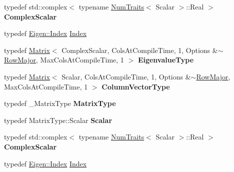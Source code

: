 \begin{DoxyCompactItemize}
typedef std\+::complex$<$ typename \hyperlink{group___core___module_struct_eigen_1_1_num_traits}{Num\+Traits}$<$ Scalar $>$\+::Real $>$ {\bfseries Complex\+Scalar}
\item 
typedef \hyperlink{namespace_eigen_a62e77e0933482dafde8fe197d9a2cfde}{Eigen\+::\+Index} \hyperlink{group___eigenvalues___module_a8bd4653e2d9569a44ecc95e746422d3f}{Index}
\item 
\mbox{\label{group___eigenvalues___module_aba61940000501482e45b704ca403fa22}} 
typedef \hyperlink{group___core___module_class_eigen_1_1_matrix}{Matrix}$<$ Complex\+Scalar, Cols\+At\+Compile\+Time, 1, Options \&$\sim$\hyperlink{group__enums_ggaacded1a18ae58b0f554751f6cdf9eb13acfcde9cd8677c5f7caf6bd603666aae3}{Row\+Major}, Max\+Cols\+At\+Compile\+Time, 1 $>$ {\bfseries Eigenvalue\+Type}
\item 
\mbox{\label{group___eigenvalues___module_ad7d4f7f6f061e66838a4a1c7666efa52}} 
typedef \hyperlink{group___core___module_class_eigen_1_1_matrix}{Matrix}$<$ Scalar, Cols\+At\+Compile\+Time, 1, Options \&$\sim$\hyperlink{group__enums_ggaacded1a18ae58b0f554751f6cdf9eb13acfcde9cd8677c5f7caf6bd603666aae3}{Row\+Major}, Max\+Cols\+At\+Compile\+Time, 1 $>$ {\bfseries Column\+Vector\+Type}
\item 
\mbox{\label{group___eigenvalues___module_a2c400724529c2d19e886e865244f6ea7}} 
typedef \+\_\+\+Matrix\+Type {\bfseries Matrix\+Type}
\item 
\mbox{\label{group___eigenvalues___module_a9f63de2b06466efed32c6e721bde71c9}} 
typedef Matrix\+Type\+::\+Scalar {\bfseries Scalar}
\item 
\mbox{\label{group___eigenvalues___module_a269c5cf978680481656ad5e86d45894a}} 
typedef std\+::complex$<$ typename \hyperlink{group___core___module_struct_eigen_1_1_num_traits}{Num\+Traits}$<$ Scalar $>$\+::Real $>$ {\bfseries Complex\+Scalar}
\item 
typedef \hyperlink{namespace_eigen_a62e77e0933482dafde8fe197d9a2cfde}{Eigen\+::\+Index} \hyperlink{group___eigenvalues___module_a8bd4653e2d9569a44ecc95e746422d3f}{Index}
\item 
\mbox{\label{group___eigenvalues___module_aba61940000501482e45b704ca403fa22}} 

\end{DoxyCompactItemize}
